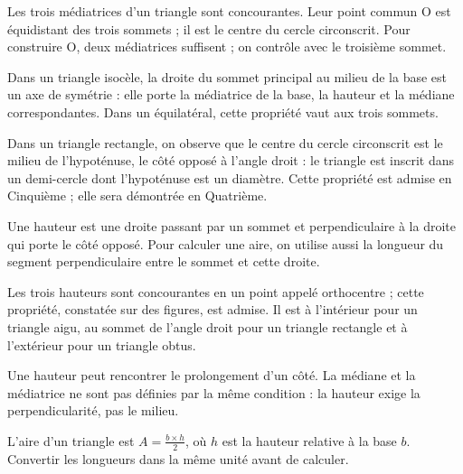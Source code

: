 \begin{propriete}Les trois médiatrices d’un triangle sont concourantes. Leur point commun O est équidistant des trois sommets ; il est le centre du cercle circonscrit. Pour construire O, deux médiatrices suffisent ; on contrôle avec le troisième sommet.\end{propriete}
\begin{savoirfaire}Dans un triangle isocèle, la droite du sommet principal au milieu de la base est un axe de symétrie : elle porte la médiatrice de la base, la hauteur et la médiane correspondantes. Dans un équilatéral, cette propriété vaut aux trois sommets.\end{savoirfaire}
\begin{propriete}Dans un triangle rectangle, on observe que le centre du cercle circonscrit est le milieu de l’hypoténuse, le côté opposé à l’angle droit : le triangle est inscrit dans un demi-cercle dont l’hypoténuse est un diamètre. Cette propriété est admise en Cinquième ; elle sera démontrée en Quatrième.\end{propriete}
\clearpage
{}\label{cours-14-3}
\begin{definition}Une hauteur est une droite passant par un sommet et perpendiculaire à la droite qui porte le côté opposé. Pour calculer une aire, on utilise aussi la longueur du segment perpendiculaire entre le sommet et cette droite.\end{definition}
\label{fig-cours-14-3-cours-hauteurs}

\begin{propriete}Les trois hauteurs sont concourantes en un point appelé orthocentre ; cette propriété, constatée sur des figures, est admise. Il est à l’intérieur pour un triangle aigu, au sommet de l’angle droit pour un triangle rectangle et à l’extérieur pour un triangle obtus.\end{propriete}
\begin{attention}Une hauteur peut rencontrer le prolongement d’un côté. La médiane et la médiatrice ne sont pas définies par la même condition : la hauteur exige la perpendicularité, pas le milieu.\end{attention}
\clearpage
{}\label{cours-14-4}
\begin{propriete}L’aire d’un triangle est $A=\frac{b\times h}{2}$, où $h$ est la hauteur relative à la base $b$. Convertir les longueurs dans la même unité avant de calculer.\end{propriete}
\label{fig-cours-14-4-cours-mediane}

